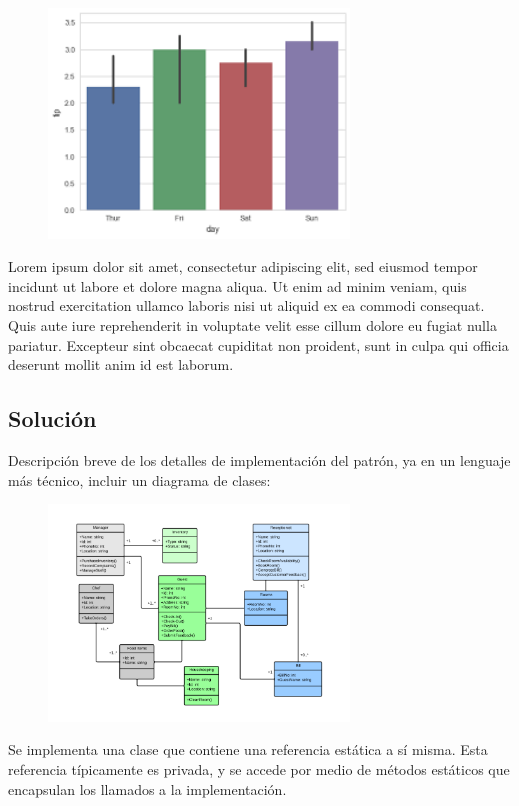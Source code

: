 \documentclass[12pt]{book}
\begin{document}
\begin{figure}[h]
\includegraphics[width=8cm]{imagenes/index.png}
\end{figure}

Lorem ipsum dolor sit amet, consectetur adipiscing elit, sed eiusmod tempor incidunt ut labore et dolore magna aliqua. Ut enim ad minim veniam, quis nostrud exercitation ullamco laboris nisi ut aliquid ex ea commodi consequat. Quis aute iure reprehenderit in voluptate velit esse cillum dolore eu fugiat nulla pariatur. Excepteur sint obcaecat cupiditat non proident, sunt in culpa qui officia deserunt mollit anim id est laborum.

\newpage
\subsection{Solución}

Descripción breve de los detalles de implementación del patrón, ya en un lenguaje más técnico, incluir un diagrama de clases:

\begin{figure}[h]
\includegraphics[width=8cm]{imagenes/uml.PNG}
\end{figure}

Se implementa una clase que contiene una referencia estática a sí misma. Esta referencia típicamente es privada, y se accede por medio de métodos estáticos que encapsulan los llamados a la implementación.
\end{document}
